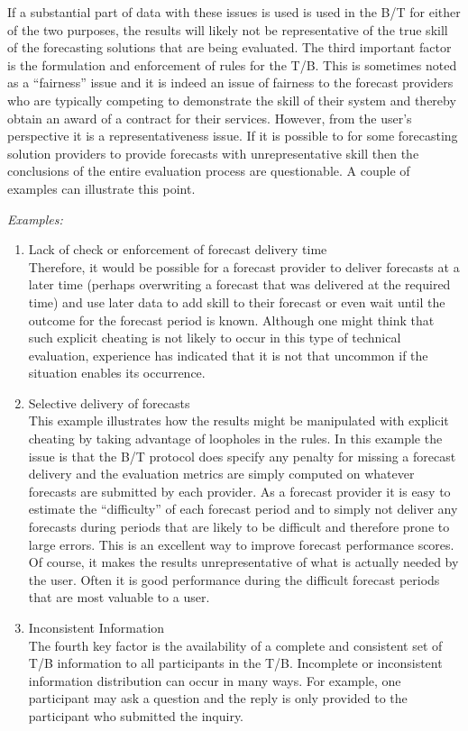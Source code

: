 If a substantial part of data with these issues is used is used in the B/T for either of the two purposes, the results will likely not be representative of the true skill of the forecasting solutions that are being evaluated.
The third important factor is the formulation and enforcement of rules for the T/B. This is sometimes noted as a “fairness” issue and it is indeed an issue of fairness to the forecast providers who are typically competing to demonstrate the skill of their system and thereby obtain an award of a contract for their services.  However, from the user’s perspective it is a representativeness issue.  If it is possible to for some forecasting solution providers to provide forecasts with unrepresentative skill then the conclusions of the entire evaluation process are questionable.  A couple of examples can illustrate this point.


\emph{Examples:} %
\begin{enumerate}
    \item Lack of check or enforcement of forecast delivery time \\
Therefore, it would be possible for a forecast provider to deliver forecasts at a later time (perhaps overwriting a forecast that was delivered at the required time) and use later data to add skill to their forecast or even wait until the outcome for the forecast period is known.  Although one might think that such explicit cheating is not likely to occur in this type of technical evaluation, experience has indicated that it is not that uncommon if the situation enables its occurrence.
    \item Selective delivery of forecasts\\ 
This example illustrates how the results might be manipulated with explicit cheating by taking advantage of loopholes in the rules.  In this example the issue is that the B/T protocol does specify any penalty for missing a forecast delivery and the evaluation metrics are simply computed on whatever forecasts are submitted by each provider.  As a forecast provider it is easy to estimate the “difficulty” of each forecast period and to simply not deliver any forecasts during periods that are likely to be difficult and therefore prone to large errors.  This is an excellent way to improve forecast performance scores.  Of course, it makes the results unrepresentative of what is actually needed by the user.  Often it is good performance during the difficult forecast periods that are most valuable to a user.
    \item Inconsistent Information\\
The fourth key factor is the availability of a complete and consistent set of T/B information to all participants in the T/B. Incomplete or inconsistent information distribution can occur in many ways.  For example, one participant may ask a question and the reply is only provided to the participant who submitted the inquiry.   
\end{enumerate}

